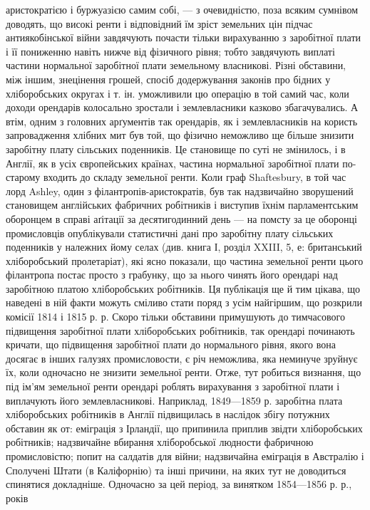 аристократією і буржуазією самим собі, — з очевидністю, поза всяким сумнівом
доводять, що високі ренти і відповідний їм зріст земельних цін підчас антиякобінської
війни завдячують почасти тільки вирахуванню з заробітної плати
і її пониженню навіть нижче від фізичного рівня; тобто завдячують виплаті
частини нормальної заробітної плати земельному власникові. Різні обставини,
між іншим, знецінення грошей, спосіб додержування законів про бідних
у хліборобських округах і т. ін. уможливили цю операцію в той самий час, коли
доходи орендарів колосально зростали і землевласники казково збагачувались.
А втім, одним з головних арґументів так орендарів, як і землевласників на
користь запровадження хлібних мит був той, що фізично неможливо ще більше
знизити заробітну плату сільських поденників. Це становище по суті не змінилось,
і в Англії, як в усіх європейських країнах, частина нормальної
заробітної плати по-старому входить до складу земельної ренти. Коли
граф Shaftesbury, в той час лорд Ashley, один з філантропів-аристократів,
був так надзвичайно зворушений становищем англійських фабричних робітників
і виступив їхнім парламентським оборонцем в справі аґітації за десятигодинний
день — на помсту за це оборонці промисловців опублікували статистичні
дані про заробітну плату сільських поденників у належних йому селах (див.
книга І, розділ XXIII, 5, е: британський хліборобський пролетаріат), які
ясно показали, що частина земельної ренти цього філантропа постає просто
з грабунку, що за нього чинять його орендарі над заробітною платою
хліборобських робітників. Ця публікація ще й тим цікава, що наведені в ній
факти можуть сміливо стати поряд з усім найгіршим, що розкрили комісії
1814 і 1815 р. р. Скоро тільки обставини примушують до тимчасового підвищення
заробітної плати хліборобських робітників, так орендарі починають кричати, що
підвищення заробітної плати до нормального рівня, якого вона досягає в інших
галузях промисловости, є річ неможлива, яка неминуче зруйнує їх, коли
одночасно не знизити земельної ренти. Отже, тут робиться визнання, що під
ім’ям земельної ренти орендарі роблять вирахування з заробітної плати і виплачують
його землевласникові. Наприклад, 1849—1859 р. заробітна плата хліборобських
робітників в Англії підвищилась в наслідок збігу потужних обставин
як от: еміграція з Ірландії, що припинила приплив звідти хліборобських
робітників; надзвичайне вбирання хліборобської людности фабричною промисловістю;
попит на салдатів для війни; надзвичайна еміграція в Австралію
і Сполучені Штати (в Каліфорнію) та інші причини, на яких тут не доводиться
спинятися докладніше. Одночасно за цей період, за винятком 1854—1856 р. р., років
